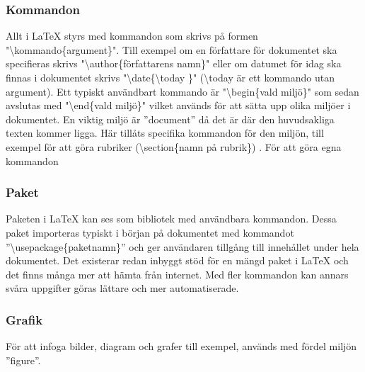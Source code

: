 \subsubsection{Kommandon}
Allt i {\LaTeX} styrs med kommandon som skrivs på formen "\textbackslash kommando\{argument\}". Till exempel om en författare för dokumentet ska specifieras skrivs "\textbackslash author\{författarens namn\}" \hspace{0.2mm} eller om datumet för idag ska finnas i dokumentet skrivs "\textbackslash date\{\textbackslash today \}" \hspace{0.2mm} (\textbackslash today är ett kommando utan argument). Ett typiskt användbart kommando är "\textbackslash begin\{vald miljö\}" \hspace{0.2mm} som sedan avslutas med "\textbackslash end\{vald miljö\}" \hspace{0.2mm} vilket används för att sätta upp olika miljöer i dokumentet. En viktig miljö är ''document''  då det är där den huvudsakliga texten kommer ligga. Här tillåts specifika kommandon för den miljön, till exempel för att göra rubriker (\textbackslash section\{namn på rubrik\}) .
\newline
\newline
För att göra egna kommandon 

\subsubsection{Paket}
Paketen i {\LaTeX} kan ses som bibliotek med användbara kommandon. Dessa paket importeras typiskt i början på dokumentet med kommandot ''\textbackslash usepackage\{paketnamn\}'' och ger användaren tillgång till innehållet under hela dokumentet. Det existerar redan inbyggt stöd för en mängd paket i {\LaTeX} och det finns många mer att hämta från internet. Med fler kommandon kan annars svåra uppgifter göras lättare och mer automatiserade.  

\subsubsection{Grafik}
För att infoga bilder, diagram och grafer till exempel, används med fördel miljön ''figure''.

